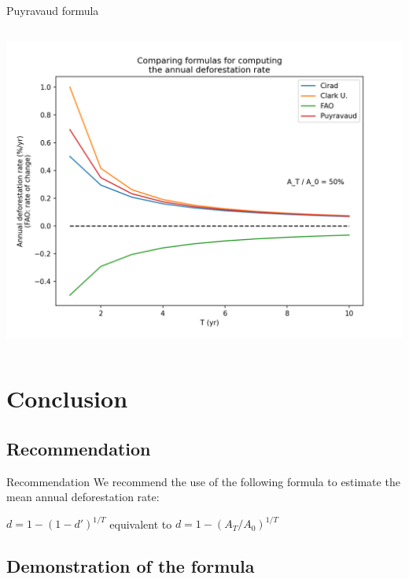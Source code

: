 \documentclass[10pt,table,dvipsnames,compress]{beamer}
\begin{document}
\begin{frame}[label={sec:org8d0c138}]{Puyravaud formula}
\begin{columns}
\begin{column}{0.5\columnwidth}
\begin{center}
\includegraphics[width=\textwidth]{figs/D-T-relationship.png}
\end{center}
\end{column}
\end{columns}
\end{frame}

\section{Conclusion}
\label{sec:orgfa4e305}

\subsection{Recommendation}
\label{sec:org6d4ca5e}

\begin{frame}[label={sec:org2e344ac}]{Recommendation}
We recommend the use of the following formula to estimate the \alert{\alert{mean annual deforestation rate}}:\\
\vspace{0.25cm}

\centering \alert{\alert{\(d = 1 - (1 - d')^{1/T}\)}} equivalent to \alert{\alert{\(d = 1 - (A_T/A_0)^{1/T}\)}}
\end{frame}

\subsection{Demonstration of the formula}
\label{sec:orgcb1e0bc}
\end{document}
